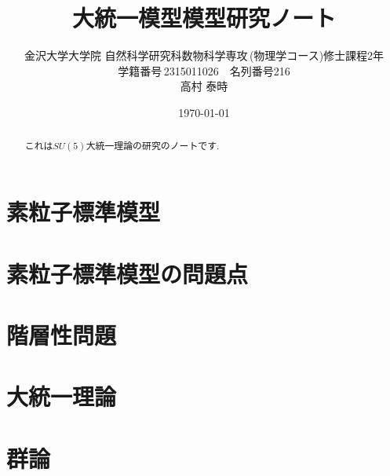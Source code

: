 \documentclass[titlepage]{jsbook}
\theoremstyle{plain}
\theoremstyle{definition}
\begin{document}
\title{大統一模型模型研究ノート}
\author{金沢大学大学院\,\,自然科学研究科数物科学専攻\,(物理学コース)修士課程2年\\学籍番号\,2315011026$\quad$名列番号216\\高村 泰時} 
\date{\today}
\maketitle

\begin{abstract}
  これは$SU(5)$大統一理論の研究のノートです.
\end{abstract}

\chapter{素粒子標準模型}


\chapter{素粒子標準模型の問題点}


\chapter{階層性問題}


\chapter{大統一理論}


\chapter{群論}





\end{document}

